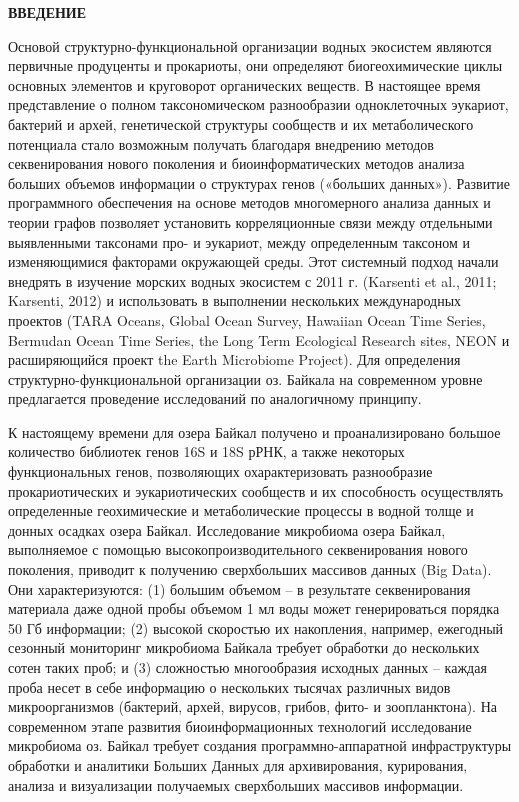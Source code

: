 \documentclass[a4paper,12pt,openany,final]{extreport}
\begin{document}
\textbf{ВВЕДЕНИЕ}

Основой структурно-функциональной организации водных экосистем являются
первичные продуценты и прокариоты, они определяют биогеохимические циклы
основных элементов и круговорот органических веществ. В настоящее время
представление о полном таксономическом разнообразии одноклеточных
эукариот, бактерий и архей, генетической структуры сообществ и их
метаболического потенциала стало возможным получать благодаря внедрению
методов секвенирования нового поколения и биоинформатических методов
анализа больших объемов информации о структурах генов («больших
данных»). Развитие программного обеспечения на основе методов
многомерного анализа данных и теории графов позволяет установить
корреляционные связи между отдельными выявленными таксонами про- и
эукариот, между определенным таксоном и изменяющимися факторами
окружающей среды. Этот системный подход начали внедрять в изучение
морских водных экосистем с 2011 г. (Karsenti et al., 2011; Karsenti,
2012) и использовать в выполнении нескольких международных проектов
(TARA Oceans, Global Ocean Survey, Hawaiian Ocean Time Series, Bermudan
Ocean Time Series, the Long Term Ecological Research sites, NEON и
расширяющийся проект the Earth Microbiome Project). Для определения
структурно-функциональной организации оз. Байкала на современном уровне
предлагается проведение исследований по аналогичному принципу.

К настоящему времени для озера Байкал получено и проанализировано
большое количество библиотек генов 16S и 18S рРНК, а также некоторых
функциональных генов, позволяющих охарактеризовать разнообразие
прокариотических и эукариотических сообществ и их способность
осуществлять определенные геохимические и метаболические процессы в
водной толще и донных осадках озера Байкал. Исследование микробиома
озера Байкал, выполняемое с помощью высокопроизводительного
секвенирования нового поколения, приводит к получению сверхбольших
массивов данных (Big Data). Они характеризуются: (1) большим объемом --
в результате секвенирования материала даже одной пробы объемом 1 мл воды
может генерироваться порядка 50 Гб информации; (2) высокой скоростью их
накопления, например, ежегодный сезонный мониторинг микробиома Байкала
требует обработки до нескольких сотен таких проб; и (3) сложностью
многообразия исходных данных -- каждая проба несет в себе информацию о
нескольких тысячах различных видов микроорганизмов (бактерий, архей,
вирусов, грибов, фито- и зоопланктона). На современном этапе развития
биоинформационных технологий исследование микробиома оз. Байкал требует
создания программно-аппаратной инфраструктуры обработки и аналитики
Больших Данных для архивирования, курирования, анализа и визуализации
получаемых сверхбольших массивов информации.
\end{document}
